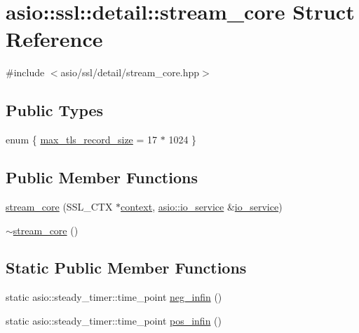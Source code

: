 \hypertarget{structasio_1_1ssl_1_1detail_1_1stream__core}{}\section{asio\+:\+:ssl\+:\+:detail\+:\+:stream\+\_\+core Struct Reference}
\label{structasio_1_1ssl_1_1detail_1_1stream__core}


{\ttfamily \#include $<$asio/ssl/detail/stream\+\_\+core.\+hpp$>$}

\subsection*{Public Types}
\begin{DoxyCompactItemize}
\item 
enum \{ \hyperlink{structasio_1_1ssl_1_1detail_1_1stream__core_a6d8fab43d93cf074312d25632039f062a497fe57d44a45883cccfbb7658dbfe21}{max\+\_\+tls\+\_\+record\+\_\+size} = 17 $\ast$ 1024
 \}
\end{DoxyCompactItemize}
\subsection*{Public Member Functions}
\begin{DoxyCompactItemize}
\item 
\hyperlink{structasio_1_1ssl_1_1detail_1_1stream__core_aa1c18ebb8efc1c67e7e58d15759c2b4d}{stream\+\_\+core} (S\+S\+L\+\_\+\+C\+T\+X $\ast$\hyperlink{classasio_1_1ssl_1_1context}{context}, \hyperlink{classasio_1_1io__service}{asio\+::io\+\_\+service} \&\hyperlink{classasio_1_1io__service}{io\+\_\+service})
\item 
\hyperlink{structasio_1_1ssl_1_1detail_1_1stream__core_a1011966a166bca47bc731a0d268a673b}{$\sim$stream\+\_\+core} ()
\end{DoxyCompactItemize}
\subsection*{Static Public Member Functions}
\begin{DoxyCompactItemize}
\item 
static asio\+::steady\+\_\+timer\+::time\+\_\+point \hyperlink{structasio_1_1ssl_1_1detail_1_1stream__core_acb4384d907a6e47792357a82c9551c35}{neg\+\_\+infin} ()
\item 
static asio\+::steady\+\_\+timer\+::time\+\_\+point \hyperlink{structasio_1_1ssl_1_1detail_1_1stream__core_afdb154460ebaaff0dfdf7fd1c43e680a}{pos\+\_\+infin} ()
\end{DoxyCompactItemize}
